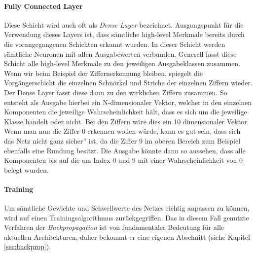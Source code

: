 \paragraph{Fully Connected Layer}
Diese Schicht wird auch oft als \emph{Dense Layer} bezeichnet. Ausgangspunkt für die Verwendung dieses Layers ist, dass sämtliche high-level Merkmale bereits durch die vorangegangenen Schichten erkannt wurden. In dieser Schicht werden sämtliche Neuronen mit allen Ausgabewerten verbunden. Generell fasst diese Schicht alle high-level Merkmale zu den jeweiligen Ausgabeklassen zusammen. Wenn wir beim Beispiel der Ziffernerkennung bleiben, spiegelt die Vorgängerschicht die einzelnen Schnörkel und Striche der einzelnen Ziffern wieder. Der Dense Layer fasst diese dann zu den wirklichen Ziffern zusammen. So entsteht als Ausgabe hierbei ein N-dimensionaler Vektor, welcher in den einzelnen Komponenten die jeweilige Wahrscheinlichkeit hält, dass es sich um die jeweilige Klasse handelt oder nicht. Bei den Ziffern wäre dies ein 10 dimensionaler Vektor. Wenn man nun die Ziffer 0 erkennen wollen würde, kann es gut sein, dass sich das Netz \glqq nicht ganz sicher'' ist, da die Ziffer 9 im oberen Bereich zum Beispiel ebenfalls eine Rundung besitzt. Die Ausgabe könnte dann so aussehen, dass alle Komponenten bis auf die am Index 0 und 9 mit einer Wahrscheinlichkeit von 0 belegt wurden. 

\paragraph{Training} 
Um sämtliche Gewichte und Schwellwerte des Netzes richtig anpassen zu können, wird auf einen Trainingsalgorithmus zurückgegriffen. Das in diesem Fall genutzte Verfahren der \emph{Backpropagation} ist von fundamentaler Bedeutung für alle aktuellen Architekturen, daher bekommt er eine eigenen Abschnitt (siehe Kapitel \ref{sec:backprop}). 
